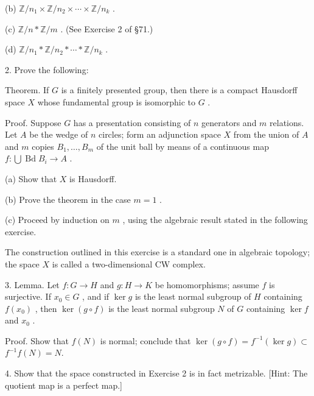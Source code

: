 (b) \(\mathbb{Z}/{n}_{1} \times  \mathbb{Z}/{n}_{2} \times  \cdots  \times  \mathbb{Z}/{n}_{k}\) .

(c) \(\mathbb{Z}/n * \mathbb{Z}/m\) . (See Exercise 2 of  \S 71.)

(d) \(\mathbb{Z}/{n}_{1} * \mathbb{Z}/{n}_{2} * \cdots  * \mathbb{Z}/{n}_{k}\) .

2. Prove the following:

Theorem. If \(G\) is a finitely presented group, then there is a compact Hausdorff space \(X\) whose fundamental group is isomorphic to \(G\) .

Proof. Suppose \(G\) has a presentation consisting of \(n\) generators and \(m\) relations. Let \(A\) be the wedge of \(n\) circles; form an adjunction space \(X\) from the union of \(A\) and \(m\) copies \({B}_{1},\ldots ,{B}_{m}\) of the unit ball by means of a continuous map \(f : \bigcup \operatorname{Bd}{B}_{i} \rightarrow  A\) .

(a) Show that \(X\) is Hausdorff.

(b) Prove the theorem in the case \(m = 1\) .

(c) Proceed by induction on \(m\) , using the algebraic result stated in the following exercise.

The construction outlined in this exercise is a standard one in algebraic topology; the space \(X\) is called a two-dimensional CW complex.

3. Lemma. Let \(f : G \rightarrow  H\) and \(g : H \rightarrow  K\) be homomorphisms; assume \(f\) is surjective. If \({x}_{0} \in  G\) , and if \(\ker g\) is the least normal subgroup of \(H\) containing \(f\left( {x}_{0}\right)\) , then \(\ker \left( {g \circ  f}\right)\) is the least normal subgroup \(N\) of \(G\) containing \(\ker f\) and \({x}_{0}\) .

Proof. Show that \(f\left( N\right)\) is normal; conclude that \(\ker \left( {g \circ  f}\right)  = {f}^{-1}\left( {\ker g}\right)  \subset\)  \({f}^{-1}f\left( N\right)  = N.\)

4. Show that the space constructed in Exercise 2 is in fact metrizable. [Hint: The quotient map is a perfect map.]